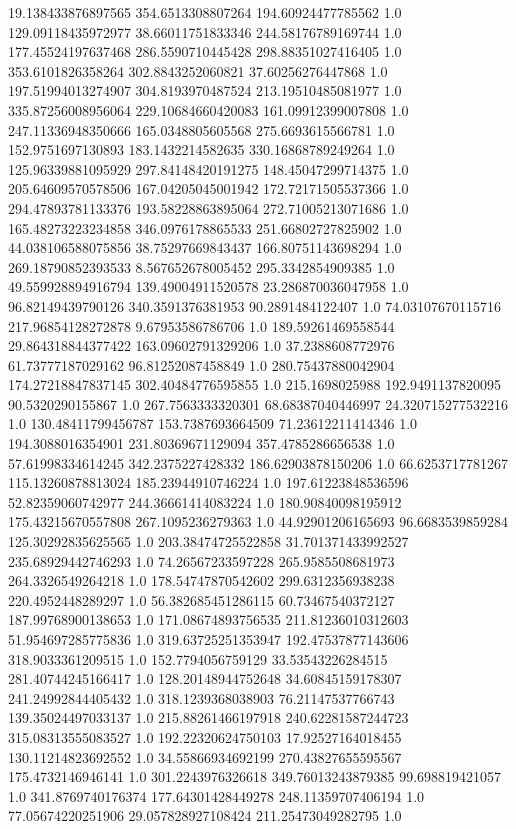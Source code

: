19.138433876897565	354.6513308807264	194.60924477785562	1.0
129.09118435972977	38.66011751833346	244.58176789169744	1.0
177.45524197637468	286.5590710445428	298.88351027416405	1.0
353.6101826358264	302.8843252060821	37.60256276447868	1.0
197.51994013274907	304.8193970487524	213.19510485081977	1.0
335.87256008956064	229.10684660420083	161.09912399007808	1.0
247.11336948350666	165.0348805605568	275.6693615566781	1.0
152.9751697130893	183.1432214582635	330.16868789249264	1.0
125.96339881095929	297.84148420191275	148.45047299714375	1.0
205.64609570578506	167.04205045001942	172.72171505537366	1.0
294.47893781133376	193.58228863895064	272.71005213071686	1.0
165.48273223234858	346.0976178865533	251.66802727825902	1.0
44.038106588075856	38.75297669843437	166.80751143698294	1.0
269.18790852393533	8.567652678005452	295.3342854909385	1.0
49.559928894916794	139.49004911520578	23.286870036047958	1.0
96.82149439790126	340.3591376381953	90.2891484122407	1.0
74.03107670115716	217.96854128272878	9.67953586786706	1.0
189.59261469558544	29.864318844377422	163.09602791329206	1.0
37.2388608772976	61.73777187029162	96.81252087458849	1.0
280.75437880042904	174.27218847837145	302.40484776595855	1.0
215.1698025988	192.9491137820095	90.5320290155867	1.0
267.7563333320301	68.68387040446997	24.320715277532216	1.0
130.48411799456787	153.7387693664509	71.23612211414346	1.0
194.3088016354901	231.80369671129094	357.4785286656538	1.0
57.61998334614245	342.2375227428332	186.62903878150206	1.0
66.6253717781267	115.13260878813024	185.23944910746224	1.0
197.61223848536596	52.82359060742977	244.36661414083224	1.0
180.90840098195912	175.43215670557808	267.1095236279363	1.0
44.92901206165693	96.6683539859284	125.30292835625565	1.0
203.38474725522858	31.701371433992527	235.68929442746293	1.0
74.26567233597228	265.9585508681973	264.3326549264218	1.0
178.54747870542602	299.6312356938238	220.4952448289297	1.0
56.382685451286115	60.73467540372127	187.99768900138653	1.0
171.08674893756535	211.81236010312603	51.954697285775836	1.0
319.63725251353947	192.47537877143606	318.9033361209515	1.0
152.7794056759129	33.53543226284515	281.40744245166417	1.0
128.20148944752648	34.60845159178307	241.24992844405432	1.0
318.1239368038903	76.21147537766743	139.35024497033137	1.0
215.88261466197918	240.62281587244723	315.08313555083527	1.0
192.22320624750103	17.92527164018455	130.11214823692552	1.0
34.55866934692199	270.43827655595567	175.4732146946141	1.0
301.2243976326618	349.76013243879385	99.698819421057	1.0
341.8769740176374	177.64301428449278	248.11359707406194	1.0
77.05674220251906	29.057828927108424	211.25473049282795	1.0
